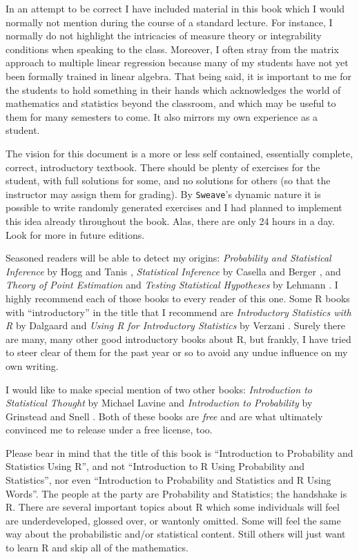 \documentclass[captions=tableheading]{scrbook}
\begin{document}
In an attempt to be correct I have included material in this book which I would normally not mention during the course of a standard lecture. For instance, I normally do not highlight the intricacies of measure theory or integrability conditions when speaking to the class. Moreover, I often stray from the matrix approach to multiple linear regression because many of my students have not yet been formally trained in linear algebra. That being said, it is important to me for the students to hold something in their hands which acknowledges the world of mathematics and statistics beyond the classroom, and which may be useful to them for many semesters to come. It also mirrors my own experience as a student.

The vision for this document is a more or less self contained, essentially complete, correct, introductory textbook. There should be plenty of exercises for the student, with full solutions for some, and no solutions for others (so that the instructor may assign them for grading). By \texttt{Sweave}'s dynamic nature it is possible to write randomly generated exercises and I had planned to implement this idea already throughout the book. Alas, there are only 24 hours in a day. Look for more in future editions.

Seasoned readers will be able to detect my origins: \emph{Probability and Statistical Inference} by Hogg and Tanis \cite{Hogg2006}, \emph{Statistical Inference} by Casella and Berger \cite{Casella2002}, and \emph{Theory of Point Estimation} and \emph{Testing Statistical Hypotheses} by Lehmann \cite{Lehmann1998,Lehmann1986}. I highly recommend each of those books to every reader of this one. Some \textsf{R} books with ``introductory'' in the title that I recommend are \emph{Introductory Statistics with R} 
by Dalgaard \cite{Dalgaard2008} and \emph{Using R for Introductory Statistics} by Verzani \cite{Verzani2005}. Surely there are many, many other good introductory books about \textsf{R}, but frankly, I have tried to steer clear of them for the past year or so to avoid any undue influence on my own writing.

I would like to make special mention of two other books: \emph{Introduction to Statistical Thought} by Michael Lavine \cite{Lavine2009} and \emph{Introduction to Probability} by Grinstead and Snell \cite{Grinstead1997}. Both of these books are \emph{free} and are what ultimately convinced me to release \IPSUR under a free license, too.

Please bear in mind that the title of this book is ``Introduction to Probability and Statistics Using \textsf{R}'', and not ``Introduction to \textsf{R} Using Probability and Statistics'', nor even ``Introduction to Probability and Statistics and \textsf{R} Using Words''. The people at the party are Probability and Statistics; the handshake is \textsf{R}. There are several important topics about \textsf{R} which some individuals will feel are underdeveloped, glossed over, or wantonly omitted. Some will feel the same way about the probabilistic and/or statistical content. Still others will just want to learn \textsf{R} and skip all of the mathematics.
\end{document}

